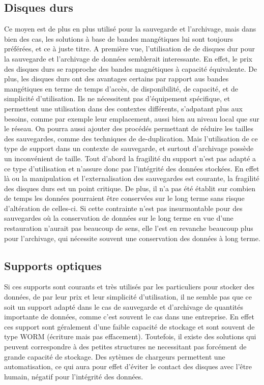 \documentclass[a4paper,11pt]{report}
\begin{document}
\subsection{Disques durs}
Ce moyen est de plus en plus utilisé pour la sauvegarde et l'archivage, mais dans bien des cas, les solutions à base de bandes mangétiques lui sont toujours préférées, et ce à juste titre.
A première vue, l'utilisation de de disques dur pour la sauvegarde et l'archivage de données semblerait interessante.
En effet, le prix des disques durs se rapproche des bandes magnétiques à capacité équivalente. De plus, les disques durs ont des avantages certains par rapport aus bandes mangétiques en terme de temps d'accès, de disponibilité, de capacité, et de simplicité d'utilisation.
Ils ne nécessitent pas d'équipement spécifique, et permettent une utilisation dans des contextes différents, s'adpatant plus aux besoins, comme par exemple leur emplacement, aussi bien au niveau local que sur le réseau.
On pourra aussi ajouter des procédés permettant de réduire les tailles des sauvegardes, comme des techniques de de-duplication.
Mais l'utilisation de ce type de support dans un contexte de sauvegarde, et surtout d'archivage possède un inconvénient de taille. Tout d'abord la fragilité du support n'est pas adapté a ce type d'utilisation et n'assure donc pas l'intégrité des données stockées. 
En effet là ou la manipulation et l'externalisation des sauvegardes est courante, la fragilité des disques durs est un point critique.
De plus, il n'a pas été établit sur combien de temps les données pourraient être conservées sur le long terme sans risque d'altération de celles-ci.
Si cette contrainte n'est pas insurmontable pour des sauvegardes où la conservation de données sur le long terme en vue d'une restauration n'aurait pas beaucoup de sens, elle l'est en revanche beaucoup plus pour l'archivage, qui nécessite souvent une conservation des données à long terme.

\subsection{Supports optiques}
Si ces supports sont courants et très utilisés par les particuliers pour stocker des données, de par leur prix et leur simplicité d'utilisation, il ne semble pas que ce soit un support adapté dans le cas de sauvegarde et d'archivage de quantités importante de données, comme c'est souvent le cas dans une entreprise.
En effet ces support sont géralement d'une faible capacité de stockage et sont souvent de type WORM (écriture mais pas effacement).
Toutefois, il existe des solutions qui peuvent correspondre à des petites structures ne necessitant pas forcément de grande capacité de stockage.
Des sytèmes de chargeurs permettent une automatisation, ce qui aura pour effet d'éviter le contact des disques avec l'être humain, négatif pour l'intégrité des données.
\end{document}
